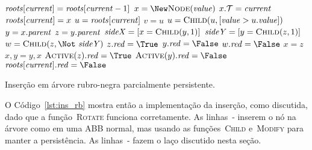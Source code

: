 \documentclass[../../main.tex]{subfiles}
\begin{document}
\begin{algorithm}
\begin{algorithmic}[1]

	\State $\mathit{roots}[\mathit{current}] = \mathit{roots}[\mathit{current} - 1]$
	\State $x = \New \Call{Node}{\val}$  \label{line:insrb:insb}
	\State $x.\mathcal{T} = \mathit{current}$
	\If{$\roots[\cur] = \Null$}
		\State $\mathit{roots}[\mathit{current}] = x$
	\Else
		\State $u = \mathit{roots}[\mathit{current}]$
		  \label{line:insrb:whilefind}
			\State $v = u$
			\State $u = \Call{Child}{u, [\val > u.\val]}$
		\EndWhile
		\State {}
	\EndIf \label{line:insrb:inse}
	 \label{line:insrb:loopb}
		\State $y = x.\mathit{parent}$ \label{line:insrb:xyzwb}
		\State $z = y.\mathit{parent}$
		\State $\V{sideX} = [x = \Call{Child}{y, 1}]$
		\State $\V{sideY} = [y = \Call{Child}{z, 1}]$ \label{line:insrb:xyzwe}
		\State $w = \Call{Child}{z, \Not\ \V{sideY}}$
		  \label{line:insrb:c1b}
			\State $z.\red = \True$
			\State $y.\red = \False$
			\State $w.\red = \False$
			\State $x = z$ \label{line:insrb:c1e}
		\Else
			  \label{line:insrb:c3b}
				\State {}
				\State $x, y = y, x$  \label{line:insrv:c3e}
			\EndIf
			\State {}  \label{line:insrb:c2b}
			\State $\Call{Active}{z}.\red = \True$ \label{line:insrb:act1}
			\State $\Call{Active}{y}.\red = \False$ \label{line:insrb:act2}
			\State \Break \label{line:insrb:c2e}
		\EndIf
	\EndWhile
	\State $\roots[\cur].\red = \False$  \label{line:insrb:loope}
\EndFunction
\end{algorithmic}
\caption{Inserção em árvore rubro-negra parcialmente persistente.} \label{lst:ins_rb}
\end{algorithm}

O Código~\ref{lst:ins_rb} mostra então a implementação da inserção, como discutida, dado que a função~\mbox{\textsc{Rotate}} funciona corretamente. As linhas~- inserem o nó na árvore como em uma ABB normal, mas usando as funções~\textsc{Child} e~\textsc{Modify} para manter a persistência. As linhas~- fazem o laço discutido nesta seção.
\end{document}
